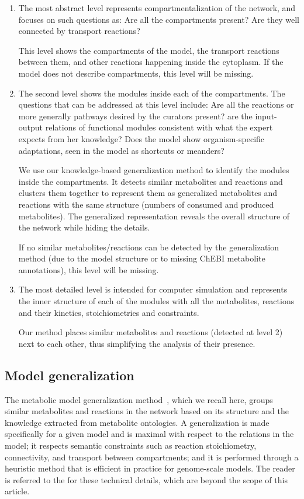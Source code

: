 \documentclass{bmcart}
\begin{document}
\begin{enumerate}
\item The most abstract level represents compartmentalization of the network, and focuses
  on such questions as: Are all the compartments present? Are they well connected by
  transport reactions? 

  This level shows the compartments of the model, the transport reactions between them,
  and other reactions happening inside the cytoplasm.  If the model does not describe
  compartments, this level will be missing.

\item The second level shows the modules inside each of the compartments. The questions
  that can be addressed at this level include: Are all the reactions or more generally pathways
  desired by the curators present? are the input-output relations of functional modules
  consistent with what the expert expects from her knowledge? Does the model show
  organism-specific adaptations, seen in the model as shortcuts or meanders?

  We use our knowledge-based generalization method to identify the modules inside the
  compartments. It detects similar metabolites and reactions and clusters them together to
  represent them as generalized metabolites and reactions with the same structure (numbers
  of consumed and produced metabolites). The generalized representation reveals the
  overall structure of the network while hiding the details.

  If no similar metabolites/reactions can be detected by the generalization method (due to
  the model structure or to missing ChEBI metabolite annotations), this level will be
  missing.

\item The most detailed level is intended for computer simulation and represents the inner
  structure of each of the modules with all the metabolites, reactions and their kinetics,
  stoichiometries and constraints.

  Our method places similar metabolites and reactions (detected at level 2) next to each
  other, thus simplifying the analysis of their presence.

\end{enumerate}

\subsection*{Model generalization}
The metabolic model generalization method~\cite{Zhukova2014}, which we recall here, groups similar metabolites and reactions in the network based on its structure and the knowledge extracted from metabolite ontologies. 
A generalization is made specifically for a given model and is maximal with respect to the
relations in the model; it respects semantic constraints such as reaction stoichiometry,
connectivity, and transport between compartments; and it is performed through a heuristic
method that is efficient in practice for genome-scale models. The reader is referred to
the \cite{Zhukova2014} for these technical details, which are beyond the scope of this article.
\end{document}
